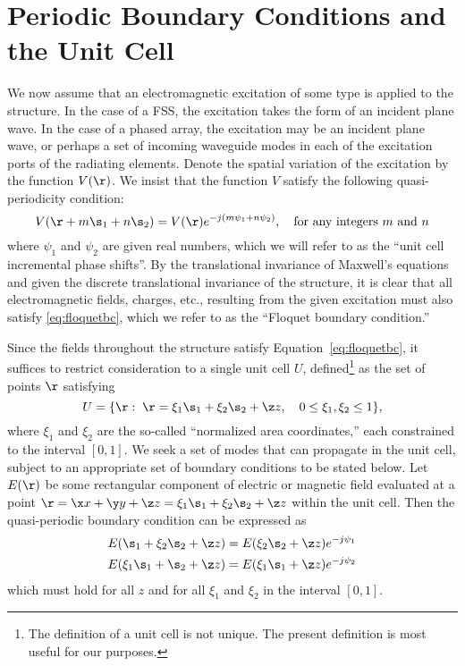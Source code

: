 \section{Periodic Boundary Conditions and the Unit Cell}
\label{sec:pbcuc}
We now assume that an electromagnetic excitation of some type is
applied to the structure.  In the case of a FSS, the excitation takes
the form of an incident plane wave.  In the case of a phased array,
the excitation may be an incident plane wave, or perhaps a set of
incoming waveguide modes in each of the excitation ports of the
radiating elements.  Denote the spatial variation of the excitation by
the function $V(\r)$.  We insist that the function $V$ satisfy the
following quasi-periodicity condition:
\begin{equation}
  \label{eq:floquetbc}
  V(\r + m\s_1 + n\s_2) = V(\r) e^{-j(m\psi_1 + n\psi_2)}, \quad
  \text{for any integers $m$ and $n$}
\end{equation}
where $\psi_1$ and $\psi_2$ are given real numbers, which we will
refer to as the ``unit cell incremental phase shifts''.  By the
translational invariance of Maxwell's equations and given the discrete
translational invariance of the structure, it is clear that all
electromagnetic fields, charges, etc., resulting from the given
excitation must also satisfy \eqref{eq:floquetbc}, which we refer to
as the ``Floquet boundary condition.''

Since the fields throughout the structure satisfy
Equation~\eqref{eq:floquetbc}, it suffices to restrict consideration
to a single unit cell $U$, defined\footnote{The definition of a unit
  cell is not unique.  The present definition is most useful for our
  purposes.}
as the set of points $\r$
satisfying
\begin{equation}
  \label{eq:unitcell}
  U = \{\r: \; \r = \xi_1 \s_1 + \xi_2 \s_2 + \z z, \quad 0 \leq \xi_1 , \xi_2
  \leq 1\},
\end{equation}
where $\xi_1$ and $\xi_2$ are the so-called ``normalized area
coordinates,'' each constrained to the interval $[0,1]$.
We seek a set of modes that can propagate in the unit cell, subject to
an appropriate set of boundary conditions to be stated below.  Let
$E(\r)$ be some rectangular component of electric or magnetic field
evaluated at a point $\r = \x x + \y y + \z z = \xi_1 \s_1 + \xi_2
\s_2 + \z z$ within the unit cell.  
Then the quasi-periodic boundary condition can be expressed as
\begin{subequations}
  \label{eq:cellfloquetbc}
  \begin{align}
    E(\s_1 + \xi_2 \s_2 + \z z) &= E(\xi_2 \s_2 + \z z) e^{-j\psi_1} \\
    E(\xi_1 \s_1 + \s_2 + \z z) &= E(\xi_1 \s_1 + \z z) e^{-j\psi_2} 
  \end{align}
\end{subequations}
  which must hold for all $z$ and for all $\xi_1$ and $\xi_2$ in the
  interval $[0,1]$.  

